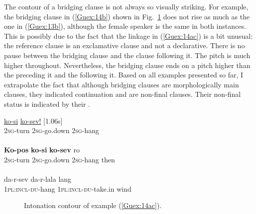 \documentclass[output=paper]{LSP/langsci}
\begin{document}
The  contour of a bridging clause is not always so visually striking. For example, the bridging clause in (\ref{Guex:14b}) shown in  Fig.~\ref{GuF4} does not rise as much as the one in (\ref{Guex:13b}), although the female speaker is the same in both instances. This is possibly due to the fact that the linkage in (\ref{Guex:14ac}) is a bit unusual: the reference clause is an exclamative clause and not a declarative. There is no pause between the bridging clause and the clause following it. The pitch is much higher throughout. Nevertheless, the bridging clause ends on a pitch higher than the  preceding it and the  following it. Based on all examples presented so far, I  extrapolate the fact that although bridging clauses are morphologically main clauses, they indicated continuation and are non-final clauses. Their non-final status is indicated by their .


\begin{exe}
\ex \label{Guex:14ac}
\begin{xlist}
\ex \label{Guex:14a}
\gll \underline{}          \underline{ko-si}                 \underline{ko-sev!}     [1.06s]\\
\textsc{2sg}-turn    \textsc{2sg}-go.down   \textsc{2sg}-hang \\
\glt {}\\
\ex \label{Guex:14b}
\gll \textbf{Ko-pos}          \textbf{ko-si}               \textbf{ko-sev}     ro \\
\textsc{2sg}-turn    \textsc{2sg}-go.down   \textsc{2sg}-hang then\\
\glt {}\\
\ex \label{Guex:14c}
\gll   da-r-sev                  da-r-lala               lang\\     	       
 \textsc{1pl:incl-du}-hang     \textsc{1pl:incl-du}-take.in   wind\\
\glt {} 
\end{xlist}
\end{exe}

\begin{figure}[ht]
\caption{Intonation contour of example (\ref{Guex:14ac}). \label{GuF4}}
\end{figure}
\end{document}

